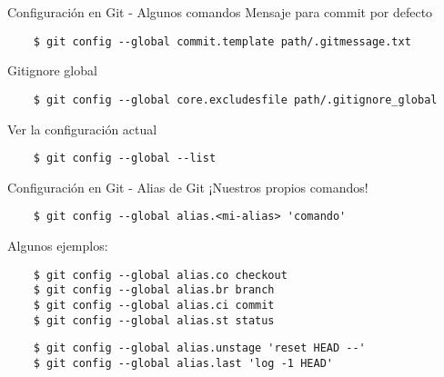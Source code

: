 \begin{frame}[fragile]{Configuración en Git - Algunos comandos}
  \alert{Mensaje para commit por defecto}
  \begin{verbatim}
    $ git config --global commit.template path/.gitmessage.txt
  \end{verbatim}
  \alert{Gitignore global}
  \begin{verbatim}
    $ git config --global core.excludesfile path/.gitignore_global
  \end{verbatim}
  \alert{Ver la configuración actual}
  \begin{verbatim}
    $ git config --global --list
  \end{verbatim}
\end{frame}

\begin{frame}[fragile]{Configuración en Git - Alias de Git}
  \alert{¡Nuestros propios comandos!}
  \begin{verbatim}
    $ git config --global alias.<mi-alias> 'comando'
  \end{verbatim}
  Algunos ejemplos:
  \begin{verbatim}
    $ git config --global alias.co checkout
    $ git config --global alias.br branch
    $ git config --global alias.ci commit
    $ git config --global alias.st status
  \end{verbatim}
  \begin{verbatim}
    $ git config --global alias.unstage 'reset HEAD --'
    $ git config --global alias.last 'log -1 HEAD'
  \end{verbatim}

\end{frame}
